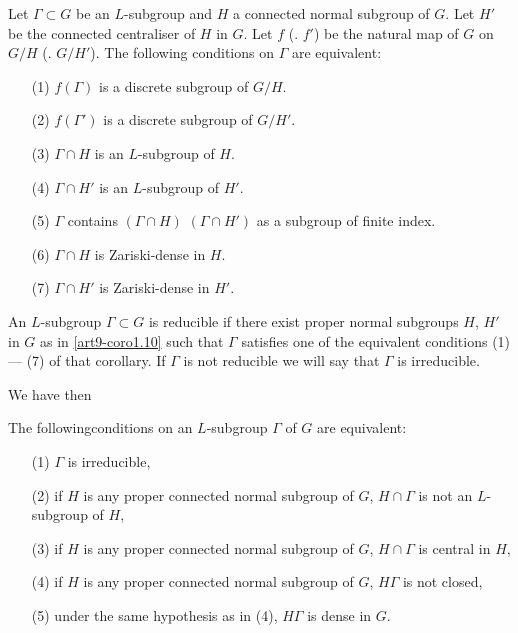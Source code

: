 \begin{coro}\label{art9-coro1.10}
Let $\Gamma \subset G$ be an $L$-subgroup and $H$ a connected normal subgroup of $G$. Let $H'$ be the connected centraliser of $H$ in $G$. Let $f$ (\resp. $f'$) be the natural map of $G$ on $G/H$ (\resp. $G/H'$). The following conditions on $\Gamma$ are equivalent:
\begin{itemize}
\item[(1)] $f(\Gamma)$ is a discrete subgroup of $G / H$.

\item[(2)] $f (\Gamma')$ is a discrete subgroup of $G/H'$.

\item[(3)] $\Gamma \cap H$ is an $L$-subgroup of $H$.

\item[(4)] $\Gamma \cap H'$ is an $L$-subgroup of $H'$.

\item[(5)] $\Gamma$ contains $(\Gamma \cap H)$ $(\Gamma \cap H')$ as a subgroup of finite index.

\item[(6)] $\Gamma \cap H$ is Zariski-dense in $H$.

\item[(7)] $\Gamma \cap H'$ is Zariski-dense in $H'$.
\end{itemize}
\end{coro}

\begin{definition}\label{art9-def1.11}
An $L$-subgroup $\Gamma \subset G$ is reducible if there exist proper normal subgroups  $H$, $H'$ in $G$ as in \ref{art9-coro1.10} such that $\Gamma$ satisfies one of the equivalent conditions (1) --- (7) of that  corollary. If $\Gamma$ is not reducible we will say that $\Gamma$ is irreducible.
\end{definition}

We have then 

\begin{coro}\label{art9-coro1.12}
The following\pageoriginale conditions on an $L$-subgroup $\Gamma$ of $G$ are equivalent:
\begin{itemize}
\item[{\rm (1)}] $\Gamma$ is irreducible,

\item[{\rm (2)}] if $H$ is any proper connected normal subgroup of $G$, $H \cap \Gamma$ is not an $L$-subgroup of $H$, 

\item[{\rm (3)}] if $H$ is any proper connected normal subgroup of $G$, $H \cap \Gamma$ is central in $H$,

\item[{\rm (4)}] if $H$ is any proper connected normal subgroup of $G$, $H \Gamma$ is not closed,

\item[{\rm (5)}] under the same hypothesis as in (4), $H \Gamma$ is dense in $G$.
\end{itemize}
\end{coro}

